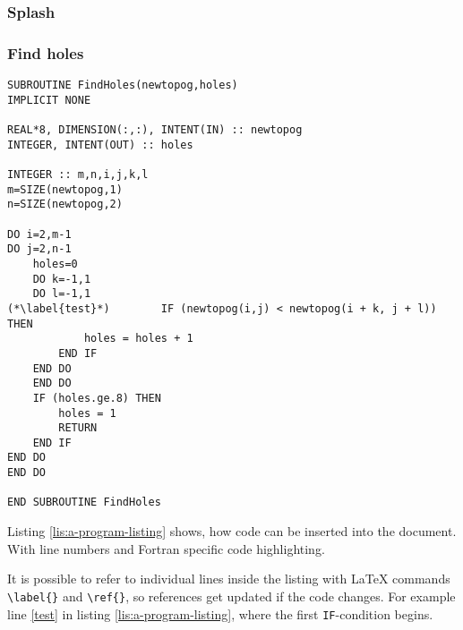 \begin{usessubs}
\end{usessubs}

\subsubsection{Splash}



\begin{usessubs}
\end{usessubs}

\subsubsection{Find holes}



\begin{lstlisting}[caption={a program listing could look like this;
notice the language sensitive formatting},label={lis:a-program-listing},breaklines=true,tabsize=4]
SUBROUTINE FindHoles(newtopog,holes) 
IMPLICIT NONE

REAL*8, DIMENSION(:,:), INTENT(IN) :: newtopog 
INTEGER, INTENT(OUT) :: holes

INTEGER :: m,n,i,j,k,l 
m=SIZE(newtopog,1) 
n=SIZE(newtopog,2)

DO i=2,m-1 
DO j=2,n-1   
    holes=0   
	DO k=-1,1   
	DO l=-1,1     
(*\label{test}*)		IF (newtopog(i,j) < newtopog(i + k, j + l)) THEN
	    	holes = holes + 1     
		END IF   
	END DO   
	END DO   
	IF (holes.ge.8) THEN     
		holes = 1     
		RETURN   
	END IF 
END DO 
END DO

END SUBROUTINE FindHoles
\end{lstlisting}


Listing \ref{lis:a-program-listing} shows, how code can be inserted
into the document. With line numbers and Fortran specific code highlighting. 

It is possible to refer to individual lines inside the listing with
\LaTeX{} commands \texttt{\textbackslash{}label\{\}} and \texttt{\textbackslash{}ref\{\}},
so references get updated if the code changes. For example line \ref{test}
in listing \ref{lis:a-program-listing}, where the first \texttt{IF}-condition
begins.

